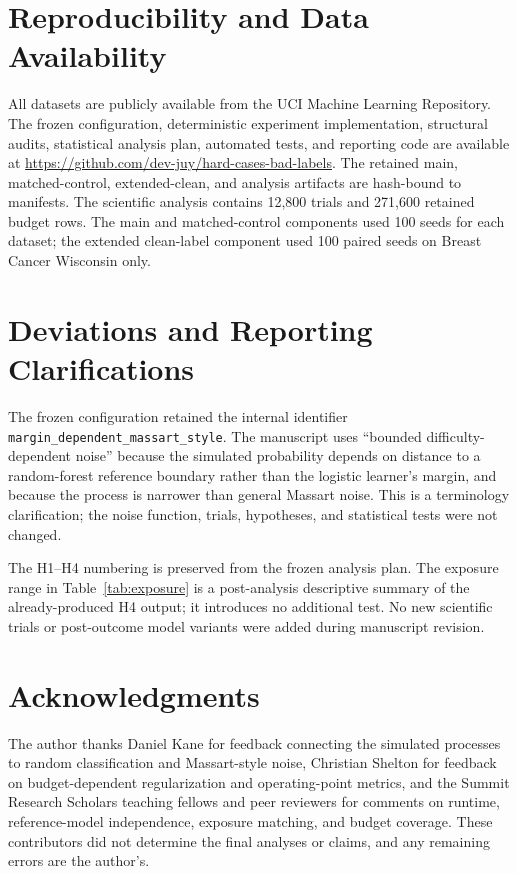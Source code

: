 \documentclass[11pt]{article}
\begin{document}
\section*{Reproducibility and Data Availability}

All datasets are publicly available from the UCI Machine Learning Repository.
The frozen configuration, deterministic experiment implementation, structural
audits, statistical analysis plan, automated tests, and reporting code are
available at
\url{https://github.com/dev-juy/hard-cases-bad-labels}. The retained main,
matched-control, extended-clean, and analysis artifacts are hash-bound to
manifests. The scientific analysis contains 12,800 trials and 271,600
retained budget rows. The main and matched-control components used 100 seeds
for each dataset; the extended clean-label component used 100 paired seeds on
Breast Cancer Wisconsin only.

\section*{Deviations and Reporting Clarifications}

The frozen configuration retained the internal identifier
\texttt{margin\_dependent\_massart\_style}. The manuscript uses
``bounded difficulty-dependent noise'' because the simulated probability
depends on distance to a random-forest reference boundary rather than the
logistic learner's margin, and because the process is narrower than general
Massart noise. This is a terminology clarification; the noise function,
trials, hypotheses, and statistical tests were not changed.

The H1--H4 numbering is preserved from the frozen analysis plan. The exposure
range in Table~\ref{tab:exposure} is a post-analysis descriptive summary of
the already-produced H4 output; it introduces no additional test. No new
scientific trials or post-outcome model variants were added during manuscript
revision.

\section*{Acknowledgments}

The author thanks Daniel Kane for feedback connecting the simulated processes
to random classification and Massart-style noise, Christian Shelton for
feedback on budget-dependent regularization and operating-point metrics, and
the Summit Research Scholars teaching fellows and peer reviewers for comments
on runtime, reference-model independence, exposure matching, and budget
coverage. These contributors did not determine the final analyses or claims,
and any remaining errors are the author's.

{\small
\setlength{\bibsep}{0.25em}


}
\end{document}

